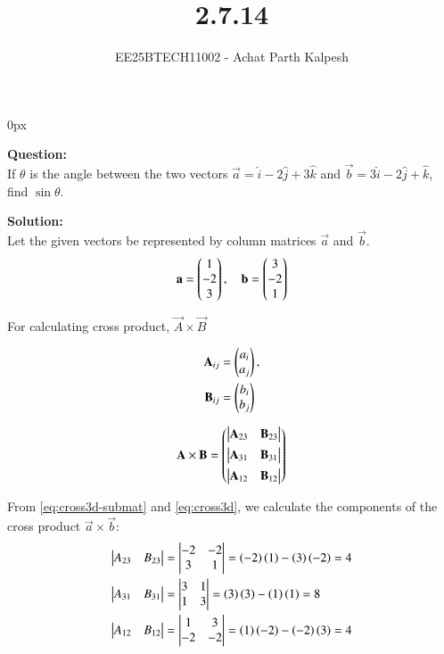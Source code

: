 \documentclass[journal]{IEEEtran}
\begin{document}

\title{2.7.14}
\author{EE25BTECH11002 - Achat Parth Kalpesh }
{\let\newpage\relax\maketitle}
\renewcommand{\thefigure}{\theenumi}
\renewcommand{\thetable}{\theenumi}
\setlength{\intextsep}{10pt} %
\renewcommand{\thetable}{\theenumi}
\parindent 0px



\textbf{Question:}\\
If $\theta$ is the angle between the two vectors $\vec{a} = \hat{i} - 2\hat{j} + 3\hat{k}$ and $\vec{b} = 3\hat{i} - 2\hat{j} + \hat{k}$, find $\sin \theta$.


\textbf{Solution:}\\
Let the given vectors be represented by column matrices $\vec{a}$ and $\vec{b}$.
\begin{align}
    \mathbf{a} = \begin{pmatrix}1 \\ -2 \\ 3\end{pmatrix}, \quad \mathbf{b} = \begin{pmatrix}3 \\ -2 \\ 1\end{pmatrix}
\end{align}

For calculating cross product, $\vec{A} \times \vec{B}$

\begin{align}
  \label{eq:cross3d-submat}
\begin{split}
  \mathbf{A}_{ij} &= \begin{pmatrix}a_i\\a_j\end{pmatrix}, 
  \\
  \mathbf{B}_{ij} &= \begin{pmatrix}b_i\\b_j\end{pmatrix}
\end{split}
\end{align}

\begin{align}
  \label{eq:cross3d}
	\mathbf{A} \times \mathbf{B} 
	 = \begin{pmatrix} \begin{vmatrix}\mathbf{A}_{23} & \mathbf{B}_{23}\end{vmatrix} \\[1ex] \begin{vmatrix}\mathbf{A}_{31} & \mathbf{B}_{31}\end{vmatrix} \\[1ex] \begin{vmatrix}\mathbf{A}_{12}  & \mathbf{B}_{12}\end{vmatrix}\end{pmatrix}
\end{align}


From \eqref{eq:cross3d-submat} and \eqref{eq:cross3d}, we calculate the components of the cross product $\vec{a} \times \vec{b}$:
\begin{align}
    \begin{vmatrix} A_{23} & B_{23} \end{vmatrix} &= \begin{vmatrix} -2 & -2 \\ 3 & 1 \end{vmatrix} = \left(-2\right)\left(1\right) - \left(3\right)\left(-2\right) = 4 \\
    \begin{vmatrix} A_{31} & B_{31} \end{vmatrix} &= \begin{vmatrix} 3 & 1 \\ 1 & 3 \end{vmatrix} = \left(3\right)\left(3\right) - \left(1\right)\left(1\right) = 8 \\
    \begin{vmatrix} A_{12} & B_{12} \end{vmatrix} &= \begin{vmatrix} 1 & 3 \\ -2 & -2 \end{vmatrix} = \left(1\right)\left(-2\right) - \left(-2\right)\left(3\right) = 4
\end{align}
\end{document}
